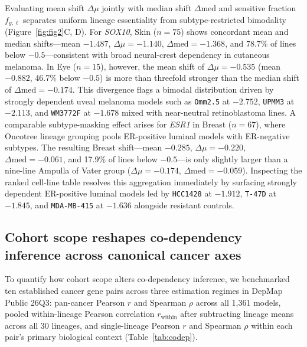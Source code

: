 \documentclass[11pt,a4paper]{article}
\begin{document}
Evaluating mean shift $\Delta\mu$ jointly with median shift $\Delta\mathrm{med}$ and sensitive fraction $f_{g,\ell}$ separates uniform lineage essentiality from subtype-restricted bimodality (Figure~\ref{fig:fig2}C, D). For \textit{SOX10}, Skin ($n = 75$) shows concordant mean and median shifts---mean $-1.487$, $\Delta\mu = -1.140$, $\Delta\mathrm{med} = -1.368$, and 78.7\% of lines below $-0.5$---consistent with broad neural-crest dependency in cutaneous melanoma. In Eye ($n = 15$), however, the mean shift of $\Delta\mu = -0.535$ (mean $-0.882$, 46.7\% below $-0.5$) is more than threefold stronger than the median shift of $\Delta\mathrm{med} = -0.174$. This divergence flags a bimodal distribution driven by strongly dependent uveal melanoma models such as \texttt{Omm2.5} at $-2.752$, \texttt{UPMM3} at $-2.113$, and \texttt{WM3772F} at $-1.678$ mixed with near-neutral retinoblastoma lines. A comparable subtype-masking effect arises for \textit{ESR1} in Breast ($n = 67$), where Oncotree lineage grouping pools ER-positive luminal models with ER-negative subtypes. The resulting Breast shift---mean $-0.285$, $\Delta\mu = -0.220$, $\Delta\mathrm{med} = -0.061$, and 17.9\% of lines below $-0.5$---is only slightly larger than a nine-line Ampulla of Vater group ($\Delta\mu = -0.174$, $\Delta\mathrm{med} = -0.059$). Inspecting the ranked cell-line table resolves this aggregation immediately by surfacing strongly dependent ER-positive luminal models led by \texttt{HCC1428} at $-1.912$, \texttt{T-47D} at $-1.845$, and \texttt{MDA-MB-415} at $-1.636$ alongside resistant controls.

\subsection{Cohort scope reshapes co-dependency inference across canonical cancer axes}
To quantify how cohort scope alters co-dependency inference, we benchmarked ten established cancer gene pairs across three estimation regimes in DepMap Public 26Q3: pan-cancer Pearson $r$ and Spearman $\rho$ across all 1,361 models, pooled within-lineage Pearson correlation $r_{\mathrm{within}}$ after subtracting lineage means across all 30 lineages, and single-lineage Pearson $r$ and Spearman $\rho$ within each pair's primary biological context (Table~\ref{tab:codep}).
\end{document}
